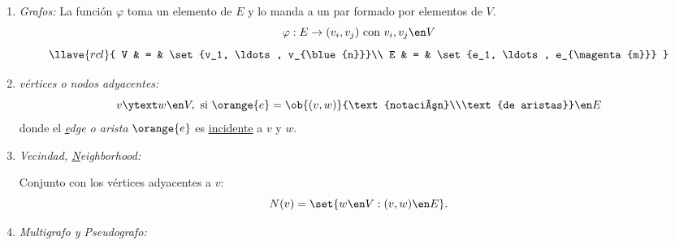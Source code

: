 \begin{enumerate}[label=\tiny\purple{\faIcon{calculator}}]
  \item \textit{Grafos:}
        La función $\varphi$ toma un elemento de $E$ y lo manda a un par formado por elementos de $V$.
        $$
          \varphi: E \to (v_i, v_j)  ~ \text{con} ~ v_i, v_j \en V
        $$
        $$
          \llave{rcl}{
            V & = & \set{v_1, \ldots, v_{\blue{n}}}\\
            E & = & \set{e_1, \ldots, e_{\magenta{m}}}
          }
        $$

  \item \textit{vértices o nodos adyacentes:}
        $$
          v \ytext w \en V, ~\text{si}~ \orange{e} = \ob{(v, w)}{\text{notación}\\\text{de aristas}} \en E
        $$
        donde el \textit{\ul{e}dge o arista} $\orange{e}$ es \ul{incidente} a $v$ y $w$.

  \item \textit{Vecindad, \ul{N}eighborhood:}

        Conjunto con los vértices adyacentes a $v$:
        $$
          N(v) = \set{w \en V : (v, w) \en E}.
        $$

  \item \textit{Multigrafo y Pseudografo:}


\end{enumerate}
